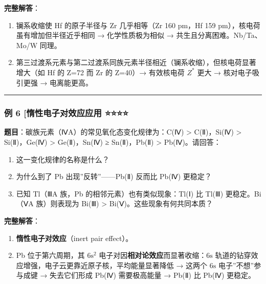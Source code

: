 \documentclass[a4paper,11pt]{ctexart}
\providecommand{\tightlist}{\setlength{\itemsep}{0pt}\setlength{\parskip}{0pt}}
\begin{document}
\textbf{完整解答}：

\begin{enumerate}
\def\labelenumi{(\arabic{enumi})}
\item
  镧系收缩使 Hf 的原子半径与 Zr 几乎相等（Zr 160 pm，Hf 159 pm），核电荷虽有增加但半径近乎相同 → 化学性质极为相似 → 共生且分离困难。Nb/Ta、Mo/W 同理。
\item
  第三过渡系元素与第二过渡系同族元素半径相近（镧系收缩），但核电荷显著增大（如 Hf 的 Z=72 而 Zr 的 Z=40）→ 有效核电荷 \(Z^*\) 更大 → 核对电子吸引更强 → 电离能更高。
\end{enumerate}

\begin{center}\rule{0.5\linewidth}{0.5pt}\end{center}

\subsubsection{例 6 {[}惰性电子对效应应用 ⭐⭐⭐⭐}\label{ux4f8b-6-ux60f0ux6027ux7535ux5b50ux5bf9ux6548ux5e94ux5e94ux7528}

\textbf{题目}：碳族元素（ⅣA）的常见氧化态变化规律为：C(Ⅳ) \textgreater{} C(Ⅱ)，Si(Ⅳ) \textgreater{} Si(Ⅱ)，Ge(Ⅳ) \textgreater{} Ge(Ⅱ)，Sn(Ⅳ) ≥ Sn(Ⅱ)，Pb(Ⅱ) \textgreater{} Pb(Ⅳ)。请回答：

\begin{enumerate}
\def\labelenumi{(\arabic{enumi})}
\tightlist
\item
  这一变化规律的名称是什么？
\item
  为什么到了 Pb 出现''反转''------Pb(Ⅱ) 反而比 Pb(Ⅳ) 更稳定？
\item
  已知 Tl（ⅢA 族，Pb 的相邻元素）也有类似现象：Tl(Ⅰ) 比 Tl(Ⅲ) 更稳定。Bi（ⅤA 族）则表现为 Bi(Ⅲ) \textgreater{} Bi(Ⅴ)。这些现象有何共同本质？
\end{enumerate}

\textbf{完整解答}：

\begin{enumerate}
\def\labelenumi{(\arabic{enumi})}
\item
  \textbf{惰性电子对效应}（inert pair effect）。
\item
  Pb 位于第六周期，其 \(6\mathrm{s}^2\) 电子对因\textbf{相对论效应}而显著收缩：\(6\mathrm{s}\) 轨道的钻穿效应增强，电子云更靠近原子核，平均能量显著降低 → 这两个 \(6\mathrm{s}\) 电子''不想''参与成键 → 失去它们形成 Pb(Ⅳ) 需要极高能量 → Pb(Ⅱ) 比 Pb(Ⅳ) 更稳定。
\end{enumerate}
\end{document}
